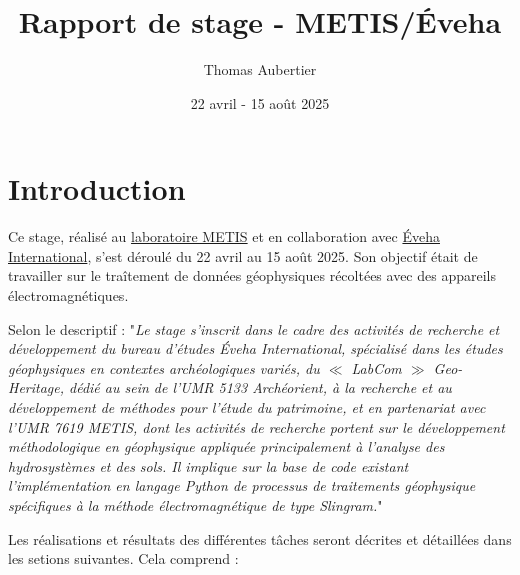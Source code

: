 \documentclass[12pt]{article}
\title{Rapport de stage - METIS/Éveha}
\author{Thomas Aubertier}
\date{22 avril - 15 août 2025}
\begin{document}
\maketitle

\begin{abstract}
        
\end{abstract}

\tableofcontents

\newpage
\section{Introduction}

    Ce stage, réalisé au \href{https://sciences.sorbonne-universite.fr/structures-de-recherche/metis}{laboratoire METIS} et en collaboration avec \href{https://www.eveha.fr/}{Éveha International}, s'est déroulé du 22 avril au 15 août 2025. Son objectif était de travailler sur le traîtement de données géophysiques récoltées avec des appareils électromagnétiques.
    
    Selon le descriptif : "\textit{Le stage s'inscrit dans le cadre des activités de recherche et développement du bureau d'études Éveha International, spécialisé dans les études géophysiques en contextes archéologiques variés, du $\ll$ LabCom $\gg$ Geo-Heritage, dédié au sein de l’UMR 5133 Archéorient, à la recherche et au développement de méthodes pour l'étude du patrimoine, et en partenariat avec l'UMR 7619 METIS, dont les activités de recherche portent sur le développement méthodologique en géophysique appliquée principalement à l’analyse des hydrosystèmes et des sols. Il implique sur la base de code existant l'implémentation en langage Python de processus de traitements géophysique spécifiques à la méthode électromagnétique de type Slingram.}"

    Les réalisations et résultats des différentes tâches seront décrites et détaillées dans les setions suivantes. Cela comprend :
\end{document}
